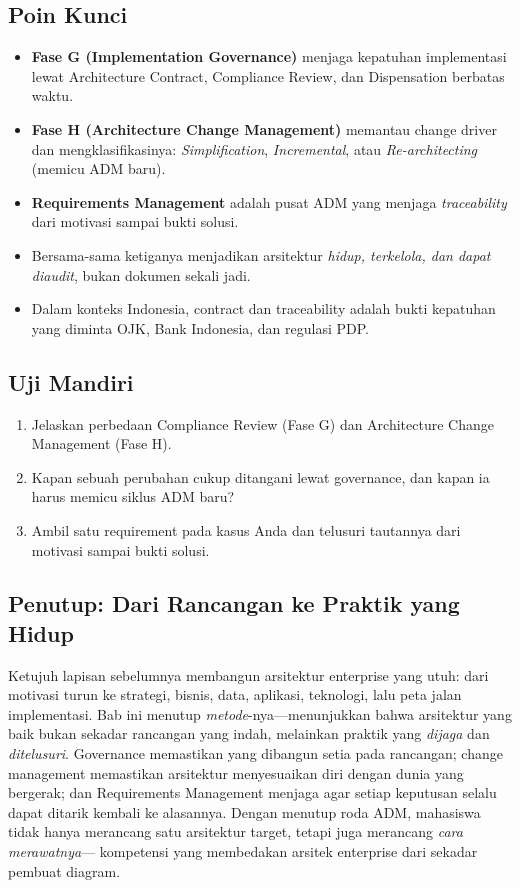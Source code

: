 \subsection*{Poin Kunci}
\begin{itemize}
  \item \textbf{Fase G (Implementation Governance)} menjaga kepatuhan implementasi
        lewat Architecture Contract, Compliance Review, dan Dispensation berbatas
        waktu.
  \item \textbf{Fase H (Architecture Change Management)} memantau change driver dan
        mengklasifikasinya: \emph{Simplification}, \emph{Incremental}, atau
        \emph{Re-architecting} (memicu ADM baru).
  \item \textbf{Requirements Management} adalah pusat ADM yang menjaga
        \emph{traceability} dari motivasi sampai bukti solusi.
  \item Bersama-sama ketiganya menjadikan arsitektur \emph{hidup, terkelola, dan
        dapat diaudit}, bukan dokumen sekali jadi.
  \item Dalam konteks Indonesia, contract dan traceability adalah bukti kepatuhan
        yang diminta OJK, Bank Indonesia, dan regulasi PDP.
\end{itemize}

\subsection*{Uji Mandiri}
\begin{enumerate}
  \item Jelaskan perbedaan Compliance Review (Fase G) dan Architecture Change
        Management (Fase H).
  \item Kapan sebuah perubahan cukup ditangani lewat governance, dan kapan ia
        harus memicu siklus ADM baru?
  \item Ambil satu requirement pada kasus Anda dan telusuri tautannya dari
        motivasi sampai bukti solusi.
\end{enumerate}

\subsection*{Penutup: Dari Rancangan ke Praktik yang Hidup}
Ketujuh lapisan sebelumnya membangun arsitektur enterprise yang utuh: dari motivasi
turun ke strategi, bisnis, data, aplikasi, teknologi, lalu peta jalan implementasi.
Bab ini menutup \emph{metode}-nya---menunjukkan bahwa arsitektur yang baik bukan
sekadar rancangan yang indah, melainkan praktik yang \emph{dijaga} dan
\emph{ditelusuri}. Governance memastikan yang dibangun setia pada rancangan;
change management memastikan arsitektur menyesuaikan diri dengan dunia yang
bergerak; dan Requirements Management menjaga agar setiap keputusan selalu dapat
ditarik kembali ke alasannya. Dengan menutup roda ADM, mahasiswa tidak hanya
merancang satu arsitektur target, tetapi juga merancang \emph{cara merawatnya}---
kompetensi yang membedakan arsitek enterprise dari sekadar pembuat diagram.

